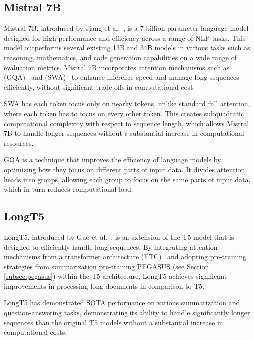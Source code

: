 \documentclass[english, ba, kiv, he, iso690numb, pdf, viewonly]{fasthesis}
\begin{document}
\subsection{Mistral 7B}
Mistral 7B, introduced by Jiang et al.~\cite{jiang2023mistral}, is a 7-billion-parameter language model designed for high performance and efficiency across a range of NLP tasks. This model outperforms several existing 13B and 34B models in various tasks such as reasoning, mathematics, and code generation capabilities on a wide range of evaluation metrics. Mistral 7B incorporates attention mechanisms such as  (GQA)~\cite{ainslie2023gqa} and  (SWA)~\cite{beltagy2020longformer} to enhance inference speed and manage long sequences efficiently, without significant trade-offs in computational cost. 

SWA has each token focus only on nearby tokens, unlike standard full attention, where each token has to focus on every other token. This creates subquadratic computational complexity with respect to sequence length, which allows Mistral 7B to handle longer sequences without a substantial increase in computational resources.

GQA is a technique that improves the efficiency of language models by optimizing how they focus on different parts of input data. It divides attention heads into groups, allowing each group to focus on the same parts of input data, which in turn reduces computational load.

\subsection{LongT5}
LongT5, introduced by Guo et al.~\cite{guo2022longt5}, is an extension of the T5 model that is designed to efficiently handle long sequences. By integrating attention mechanisms from a transformer architecture  (ETC)~\cite{ainslie2020etc} and adopting pre-training strategies from summarization pre-training PEGASUS (see Section \ref{subsec:pegasus}) within the T5 architecture, LongT5 achieves significant improvements in processing long documents in comparison to T5. 

LongT5 has demonstrated SOTA performance on various summarization and question-answering tasks, demonstrating its ability to handle significantly longer sequences than the original T5 models without a substantial increase in computational costs.
\end{document}
